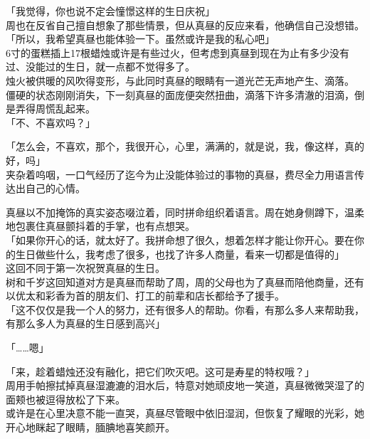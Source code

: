 「我觉得，你也说不定会憧憬这样的生日庆祝」\\

周也在反省自己擅自想象了那些情景，但从真昼的反应来看，他确信自己没想错。\\

「所以，我希望真昼也能体验一下。虽然或许是我的私心吧」\\

6寸的蛋糕插上17根蜡烛或许是有些过火，但考虑到真昼到现在为止有多少没有过、没能过的生日，就一点都不觉得多了。\\

烛火被供暖的风吹得变形，与此同时真昼的眼睛有一道光芒无声地产生、滴落。\\

僵硬的状态刚刚消失，下一刻真昼的面庞便突然扭曲，滴落下许多清澈的泪滴，倒是弄得周慌乱起来。\\

「不、不喜欢吗？」

「怎么会，不喜欢，那个，我很开心，心里，满满的，就是说，我，像这样，真的好，吗」\\

夹杂着呜咽，一口气经历了迄今为止没能体验过的事物的真昼，费尽全力用语言传达出自己的心情。

真昼以不加掩饰的真实姿态啜泣着，同时拼命组织着语言。周在她身侧蹲下，温柔地包裹住真昼颤抖着的手掌，也有点想哭。\\

「如果你开心的话，就太好了。我拼命想了很久，想着怎样才能让你开心。要在你的生日做些什么，我考虑了很多，也找了许多人商量，看来一切都是值得的」\\

这回不同于第一次祝贺真昼的生日。\\

树和千岁这回知道对方是真昼而帮助了周，周的父母也为了真昼而陪他商量，还有以优太和彩香为首的朋友们、打工的前辈和店长都给予了援手。\\

「这不仅仅是我一个人的努力，还有很多人的帮助。你看，有那么多人来帮助我，有那么多人为真昼的生日感到高兴」

「……嗯」

「来，趁着蜡烛还没有融化，把它们吹灭吧。这可是寿星的特权哦？」\\

周用手帕擦拭掉真昼湿漉漉的泪水后，特意对她顽皮地一笑道，真昼微微哭湿了的面颊也被逗得放松了下来。\\

或许是在心里决意不能一直哭，真昼尽管眼中依旧湿润，但恢复了耀眼的光彩，她开心地眯起了眼睛，腼腆地喜笑颜开。

